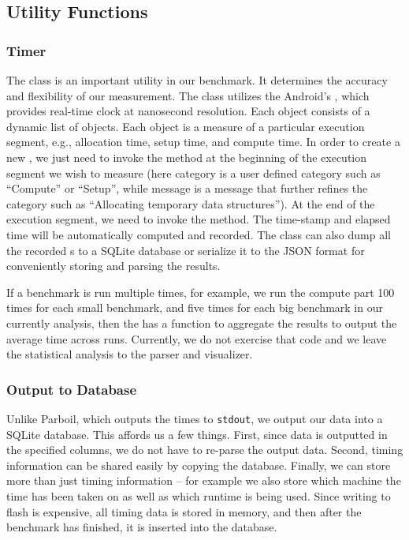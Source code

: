 \subsection{Utility Functions}
\subsubsection{Timer}
The  class is an important utility in our benchmark. It
determines the accuracy and flexibility of our measurement. The 
class utilizes the Android's , which provides real-time clock at
nanosecond resolution. Each  object consists of a dynamic list of
 objects. Each  object is a measure of a
particular execution segment, e.g., allocation time, setup time, and compute
time. In order to create a new , we just need to invoke the
 method at the beginning of the execution
segment we wish to measure (here category is a user defined category such as
``Compute'' or ``Setup'', while message is a message that further refines the
category such as ``Allocating temporary data structures''). At the end of the
execution segment, we need to invoke the  method. The
time-stamp and elapsed time will be automatically computed and recorded.
The  class can also dump all the recorded s to a
SQLite database or serialize it to the JSON format for conveniently storing and
parsing the results.

If a benchmark is run multiple times, for example, we run the compute part 100
times for each small benchmark, and five times for each big benchmark in our
currently analysis, then the  has a function to aggregate the results
to output the average time across runs.  Currently, we do not exercise that code
and we leave the statistical analysis to the parser and visualizer.

\subsubsection{Output to Database}

Unlike Parboil, which outputs the times to {\tt stdout}, we output our data into
a SQLite database.  This affords us a few things.  First, since data is
outputted in the specified columns, we do not have to re-parse the output data.
Second, timing information can be shared easily by copying the database.
Finally, we can store more than just timing information -- for example we also
store which machine the time has been taken on as well as which runtime is being
used.  Since writing to flash is expensive, all timing data is stored in memory,
and then after the benchmark has finished, it is inserted into the database. 

